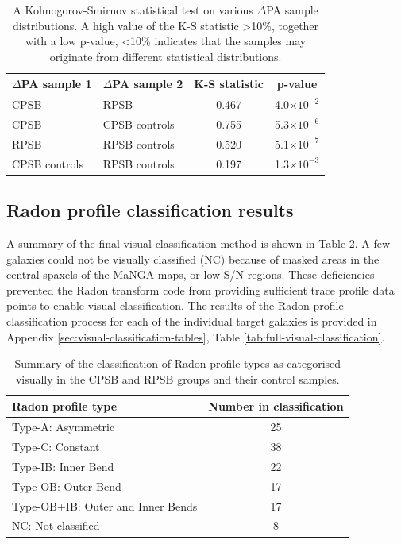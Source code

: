 \begin{table}
\caption[Kolmogorov-Smirnov statistical test of $\Delta$PA distributions]{A Kolmogorov-Smirnov statistical test on various $\Delta$PA sample distributions. A high value of the K-S statistic \textgreater 10\%, together with a low p-value, \textless 10\% indicates that the samples may originate from different statistical distributions.}
\label{tab:K-S-tests}
\begin{tabular}{llcc}
\hline
$\Delta$PA sample 1  & $\Delta$PA sample 2 & K-S statistic & p-value \\
\hline
CPSB & RPSB & 0.467 & 4.0$\times10^{-2}$ \\
CPSB & CPSB controls & 0.755 & 5.3$\times10^{-6}$ \\
RPSB & RPSB controls & 0.520 & 5.1$\times10^{-7}$ \\
CPSB controls & RPSB controls & 0.197 & 1.3$\times10^{-3}$ \\
\hline
\end{tabular}
\end{table}

\subsection{Radon profile classification results}
\label{sec:Radon-profile-classification}

A summary of the final visual classification method is shown in Table \ref{tab:Radon-class-summary}.  A few galaxies could not be visually classified (NC) because of masked areas in the central spaxels of the MaNGA maps, or low S/N regions. These deficiencies prevented the Radon transform code from providing sufficient trace profile data points to enable visual classification. The results of the Radon profile classification process for each of the individual target galaxies is provided in Appendix \ref{sec:visual-classification-tables}, Table \ref{tab:full-visual-classification}. 

\begin{table}
    \centering
    \caption[Summary of Radon profile type visual classifications]{Summary of the classification of Radon profile types as categorised visually in the CPSB and RPSB groups and their control samples.}
    \label{tab:Radon-class-summary}
    \begin{tabular}{lc}
    \hline
    Radon profile type & Number in classification \\
    \hline
    Type-A: Asymmetric & 25 \\
    Type-C: Constant & 38 \\
    Type-IB: Inner Bend & 22 \\
    Type-OB: Outer Bend & 17 \\
    Type-OB+IB: Outer and Inner Bends & 17 \\
    NC: Not classified & 8 \\
    \hline
    \end{tabular}
\end{table}

